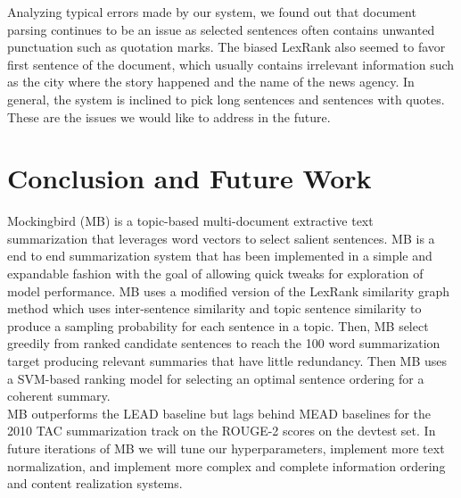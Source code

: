 \documentclass[11pt,a4paper]{article}
\begin{document}
Analyzing typical errors made by our system, we found out that document parsing continues to be an issue as selected sentences often contains unwanted punctuation such as quotation marks. The biased LexRank also seemed to favor first sentence of the document, which usually contains irrelevant information such as the city where the story happened and the name of the news agency. In general, the system is inclined to pick long sentences and sentences with quotes. These are the issues we would like to address in the future.
\section{Conclusion and Future Work}
Mockingbird (MB) is a topic-based multi-document extractive text summarization that leverages word vectors to select salient sentences. MB is a end to end summarization system that has been implemented in a simple and expandable fashion with the goal of allowing quick tweaks for exploration of model performance.
MB uses a modified version of the LexRank similarity graph method which uses inter-sentence similarity and topic sentence similarity to produce a sampling probability for each sentence in a topic. Then, MB select greedily from ranked candidate sentences to reach the 100 word summarization target producing relevant summaries that have little redundancy. Then MB uses a SVM-based ranking model for selecting an optimal sentence ordering for a coherent summary.\\
MB outperforms the LEAD baseline but lags behind MEAD baselines for the 2010 TAC summarization track on the ROUGE-2 scores on the devtest set.
In future iterations of MB we will tune our hyperparameters, implement more text normalization, and implement more complex and complete information ordering and content realization systems.


\end{document}
